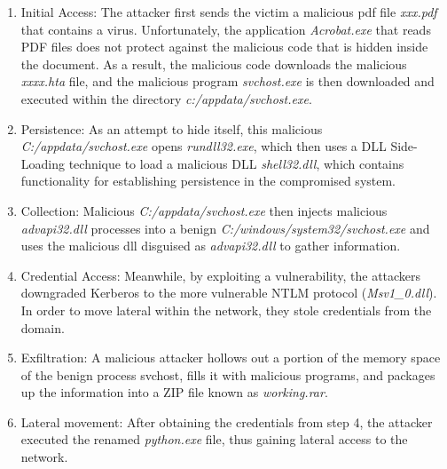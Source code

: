 \begin{enumerate}[leftmargin=*]
    \item Initial Access: The attacker first sends the victim a malicious pdf file \textit{xxx.pdf} that contains a virus. Unfortunately, the application \textit{Acrobat.exe} that reads PDF files does not protect against the malicious code that is hidden inside the document. As a result, the malicious code downloads the malicious \textit{xxxx.hta} file, and the malicious program \textit{svchost.exe} is then downloaded and executed within the directory \textit{c:/appdata/svchost.exe}.
    \item Persistence: As an attempt to hide itself, this malicious \textit{C:/appdata/svchost.exe} opens \textit{rundll32.exe}, which then uses a DLL Side-Loading technique to load a malicious DLL \textit{shell32.dll}, which contains functionality for establishing persistence in the compromised system.
    \item Collection: Malicious \textit{C:/appdata/svchost.exe} then injects malicious \textit{advapi32.dll} processes into a benign \textit{C:/windows/system32/svchost.exe} and uses the malicious dll disguised as \textit{advapi32.dll} to gather information.
    \item Credential Access: Meanwhile, by exploiting a vulnerability, the attackers downgraded Kerberos to the more vulnerable NTLM protocol (\textit{Msv1\_0.dll}). In order to move lateral within the network, they stole credentials from the domain.
    \item Exfiltration: A malicious attacker hollows out a portion of the memory space of the benign process svchost, fills it with malicious programs, and packages up the information into a ZIP file known as \textit{working.rar}.
    \item Lateral movement: After obtaining the credentials from step 4, the attacker executed the renamed \textit{python.exe} file, thus gaining lateral access to the network.
\end{enumerate}




